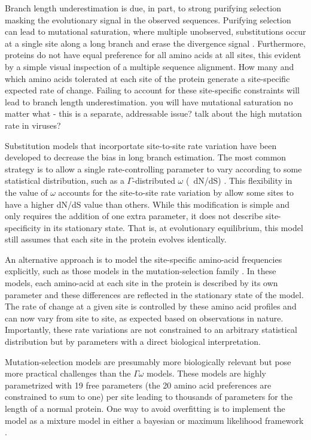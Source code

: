 \documentclass[11pt]{article}
\newcommand\skhcomment[1]{{\color{cyan}#1}}
\begin{document}
Branch length underestimation is due, in part, to strong purifying selection masking the evolutionary signal in the observed sequences. 
Purifying selection can lead to mutational saturation, where multiple unobserved, substitutions occur at a single site along a long branch and erase the divergence signal \citep{holmes2003molecular}.
Furthermore, proteins do not have equal preference for all amino acids at all sites, this evident by a simple visual inspection of a multiple sequence alignment. 
How many and which amino acids tolerated at each site of the protein generate a site-specific expected rate of change. 
Failing to account for these site-specific constraints will lead to branch length underestimation. 
\skhcomment{you will have mutational saturation no matter what - this is a separate, addressable issue?}
\skhcomment{talk about the high mutation rate in viruses?}

Substitution models that incorportate site-to-site rate variation have been developed to decrease the bias in long branch estimation. 
The most common strategy is to allow a single rate-controlling parameter to vary according to some statistical distribution, such as a $\Gamma$-distributed $\omega$ (~dN/dS) \citep{yang2000codon}. 
This flexibility in the value of $\omega$ accounts for the site-to-site rate variation by allow some sites to have a higher dN/dS value than others. 
While this modification is simple and only requires the addition of one extra parameter, it does not describe site-specificity in its stationary state. 
That is, at evolutionary equilibrium, this model still assumes that each site in the protein evolves identically.  

An alternative approach is to model the site-specific amino-acid frequencies explicitly, such as those models in the mutation-selection family \citep{halpern1998evolutionary}. 
In these models, each amino-acid at each site in the protein is described by its own parameter and these differences are reflected in the stationary state of the model. 
The rate of change at a given site is controlled by these amino acid profiles and can now vary from site to site, as expected based on observations in nature. 
Importantly, these rate variations are not constrained to an arbitrary statistical distribution but by parameters with a direct biological interpretation. 

Mutation-selection models are presumably more biologically relevant but pose more practical challenges than the $\Gamma\omega$ models. 
These models are highly parametrized with 19 free parameters (the 20 amino acid preferences are constrained to sum to one) per site leading to thousands of parameters for the length of a normal protein. 
One way to avoid overfitting is to implement the model as a mixture model in either a bayesian \citep{lartillot2004bayesian} or maximum likelihood framework \citep{si2008empirical}. 
\end{document}
